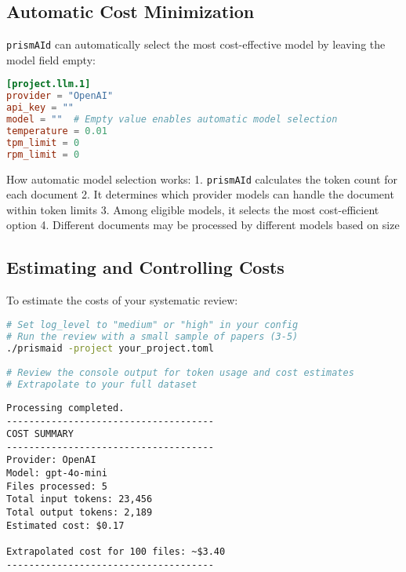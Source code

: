 
\subsection{Automatic Cost Minimization}

\texttt{prismAId} can automatically select the most cost-effective model by leaving the model field empty:

\begin{configbox}
\begin{lstlisting}[language=TOML]
[project.llm.1]
provider = "OpenAI"
api_key = ""
model = ""  # Empty value enables automatic model selection
temperature = 0.01
tpm_limit = 0
rpm_limit = 0
\end{lstlisting}
\end{configbox}

How automatic model selection works:
1. \texttt{prismAId} calculates the token count for each document
2. It determines which provider models can handle the document within token limits
3. Among eligible models, it selects the most cost-efficient option
4. Different documents may be processed by different models based on size


\subsection{Estimating and Controlling Costs}

To estimate the costs of your systematic review:

\begin{commandbox}
\begin{lstlisting}[language=Bash]
# Set log_level to "medium" or "high" in your config
# Run the review with a small sample of papers (3-5)
./prismaid -project your_project.toml

# Review the console output for token usage and cost estimates
# Extrapolate to your full dataset
\end{lstlisting}
\end{commandbox}

\begin{configbox}
\begin{lstlisting}
Processing completed.
-------------------------------------
COST SUMMARY
-------------------------------------
Provider: OpenAI
Model: gpt-4o-mini
Files processed: 5
Total input tokens: 23,456
Total output tokens: 2,189
Estimated cost: $0.17

Extrapolated cost for 100 files: ~$3.40
-------------------------------------
\end{lstlisting}
\end{configbox}

